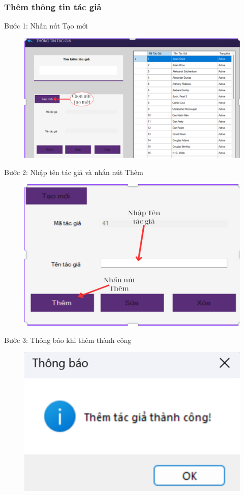 \documentclass{article}
\begin{document}
\newpage
\subsubsection{Thêm thông tin tác giả}
Bước 1: Nhấn nút Tạo mới
\begin{figure} [H]
    \centering
    \includegraphics[width=0.8\linewidth]{images//Winform/thêm tg1.png}
    \label{fig:enter-label}
\end{figure}

Bước 2: Nhập tên tác giả và nhấn nút Thêm
\begin{figure} [H]
    \centering
    \includegraphics[width=0.5\linewidth]{images//Winform/thêm tg2.png}
    \label{fig:enter-label}
\end{figure}

Bước 3: Thông báo khi thêm thành công
\begin{figure} [H]
    \centering
    \includegraphics[width=0.5\linewidth]{images/Winform/thêm tg3.png}
    \label{fig:enter-label}
\end{figure}

\newpage
\end{document}
